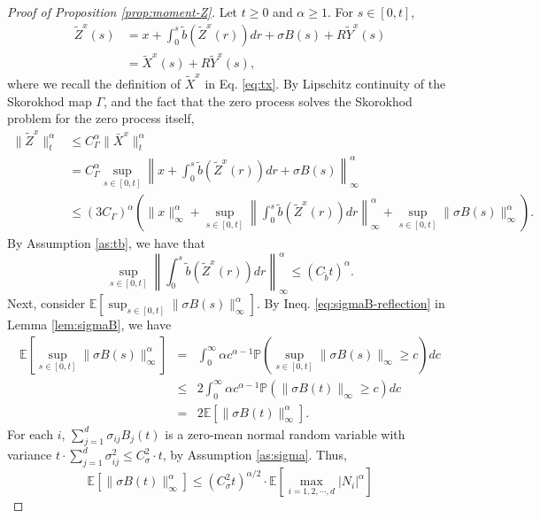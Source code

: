 \documentclass[11pt]{article}
\theoremstyle{definition}
\theoremstyle{plain}
\newcommand{\pr}{\mathbb{P}}
\newcommand{\E}{\mathbb{E}}
\newcommand{\tb}{\tilde{b}}
\begin{document}
\begin{appendices}
\begin{proof}[Proof of Proposition \ref{prop:moment-Z}] 
Let $t \ge 0$ and $\alpha \ge 1$. For $s \in [0, t]$,
\begin{align*}
\tilde{Z}^x(s) &= x + \int_0^s \tb(\tilde{Z}^x(r))dr + \sigma B(s) + R \tilde{Y}^x(s) \\
&= \tilde{X}^x(s) + R \tilde{Y}^x(s),
\end{align*}
where we recall the definition of $\tilde X^x$ in Eq. \eqref{eq:tx}.  
By Lipschitz continuity of the Skorokhod map $\Gamma$, 
and the fact that the zero process solves the Skorokhod problem for the zero process itself, 
\begin{align}
\| \tilde{Z}^x \|_t^\alpha &\leq C_{\Gamma}^\alpha \| \bar{X}^x \|_t^\alpha \\
&=  C_{\Gamma}^\alpha \sup_{s \in [0, t]} \left\| x + \int_0^s \tb(\tilde{Z}^x(r))dr + \sigma B(s) \right\|^\alpha_\infty \nonumber \\
&\leq (3 C_{\Gamma})^\alpha \left( \|x\|^\alpha_\infty + \sup_{s \in [0, t]} \left\| \int_0^s \tb(\tilde{Z}^x(r))dr \right\|^\alpha_\infty + \sup_{s \in [0, t]} \|\sigma B(s)\|^\alpha_\infty \right). 
\label{eq:moment-Z1-app}
\end{align}
By Assumption \ref{as:tb}, we have that 
\begin{equation}\label{eq:moment-Z-tb-app}
\sup_{s \in [0, t]} \left\| \int_0^s \tb(\tilde{Z}^x(r))dr \right\|^\alpha_\infty 
\le \left(C_{\tb} t\right)^\alpha.
\end{equation}
Next, consider $\E\left[\sup_{s \in [0, t]} \|\sigma B(s)\|^\alpha_\infty\right]$. 
By Ineq. \eqref{eq:sigmaB-reflection} in Lemma \ref{lem:sigmaB}, we have
\begin{eqnarray}
\E\left[\sup_{s \in [0, t]} \|\sigma B(s)\|^\alpha_\infty\right] &=& \int_0^\infty \alpha c^{\alpha-1} \pr\left(\sup_{s \in [0, t]} \|\sigma B(s)\|_\infty \geq c \right) dc \nonumber \\
&\leq & 2 \int_0^\infty \alpha c^{\alpha-1} \pr\left(\|\sigma B(t)\|_\infty \geq c \right) dc \nonumber \\
&=& 2\E\left[\|\sigma B(t)\|^\alpha_\infty\right].
\label{eq:sigmaB-moment-app}
\end{eqnarray}
For each $i$, $\sum_{j=1}^d \sigma_{ij} B_j(t)$ is a zero-mean normal random variable 
with variance $t \cdot \sum_{j=1}^d \sigma_{ij}^2 \leq C_\sigma^2 \cdot t$, by Assumption \ref{as:sigma}.
Thus, 
\[
\E\left[\|\sigma B(t)\|^\alpha_\infty\right] \leq \left(C_\sigma^2 t\right)^{\alpha/2} \cdot \E\left[\max_{i=1, 2, \cdots, d} |N_i|^{\alpha}\right] 
\]
\end{proof}
\end{appendices}
\end{document}
